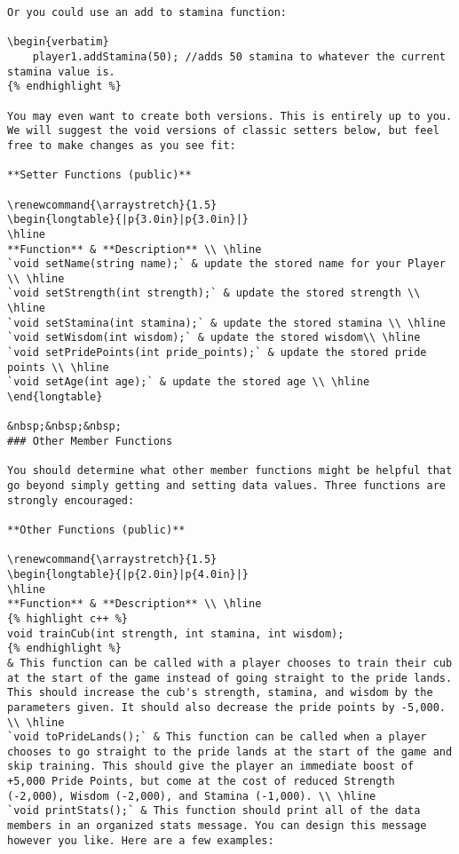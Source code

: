 {{\begin{verbatim}
Or you could use an add to stamina function:

\begin{verbatim}
    player1.addStamina(50); //adds 50 stamina to whatever the current stamina value is.
{% endhighlight %}

You may even want to create both versions. This is entirely up to you. We will suggest the void versions of classic setters below, but feel free to make changes as you see fit:

**Setter Functions (public)**

\renewcommand{\arraystretch}{1.5} 
\begin{longtable}{|p{3.0in}|p{3.0in}|}
\hline
**Function** & **Description** \\ \hline
`void setName(string name);` & update the stored name for your Player \\ \hline
`void setStrength(int strength);` & update the stored strength \\ \hline
`void setStamina(int stamina);` & update the stored stamina \\ \hline
`void setWisdom(int wisdom);` & update the stored wisdom\\ \hline
`void setPridePoints(int pride_points);` & update the stored pride points \\ \hline
`void setAge(int age);` & update the stored age \\ \hline
\end{longtable}

&nbsp;&nbsp;&nbsp;
### Other Member Functions

You should determine what other member functions might be helpful that go beyond simply getting and setting data values. Three functions are strongly encouraged:

**Other Functions (public)**

\renewcommand{\arraystretch}{1.5} 
\begin{longtable}{|p{2.0in}|p{4.0in}|}
\hline
**Function** & **Description** \\ \hline
{% highlight c++ %}
void trainCub(int strength, int stamina, int wisdom);
{% endhighlight %} 
& This function can be called with a player chooses to train their cub at the start of the game instead of going straight to the pride lands. This should increase the cub's strength, stamina, and wisdom by the parameters given. It should also decrease the pride points by -5,000. \\ \hline
`void toPrideLands();` & This function can be called when a player chooses to go straight to the pride lands at the start of the game and skip training. This should give the player an immediate boost of +5,000 Pride Points, but come at the cost of reduced Strength (-2,000), Wisdom (-2,000), and Stamina (-1,000). \\ \hline
`void printStats();` & This function should print all of the data members in an organized stats message. You can design this message however you like. Here are a few examples:


\end{verbatim}}}

